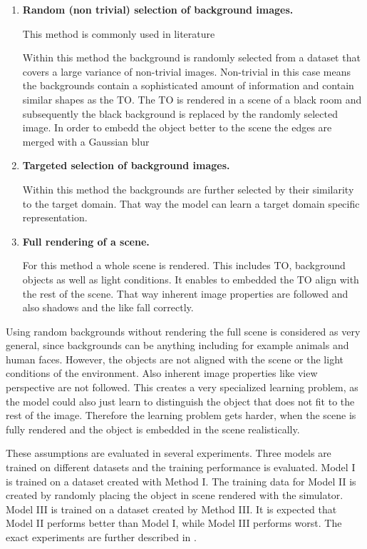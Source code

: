 \begin{enumerate}

\item \textbf{Random (non trivial) selection of background images.}

This method is commonly used in literature 

Within this method the background is randomly selected from a dataset that covers a large variance of non-trivial images. Non-trivial in this case means the backgrounds contain a sophisticated amount of information and contain similar shapes as the \ac{TO}. The \ac{TO} is rendered in a scene of a black room and subsequently the black background is replaced by the randomly selected image. In order to embedd the object better to the scene the edges are merged with a Gaussian blur 

\item \textbf{Targeted selection of background images.}

Within this method the backgrounds are further selected by their similarity to the target domain. That way the model can learn a target domain specific representation.

\item \textbf{Full rendering of a scene.}

For this method a whole scene is rendered. This includes \ac{TO}, background objects as well as light conditions. It enables to embedded the \ac{TO} align with the rest of the scene. That way inherent image properties are followed and also shadows and the like fall correctly.

\end{enumerate}

Using random backgrounds without rendering the full scene is considered as very general, since backgrounds can be anything including for example animals and human faces. However, the objects are not aligned with the scene or the light conditions of the environment. Also inherent image properties like view perspective are not followed. This creates a very specialized learning problem, as the model could also just learn to distinguish the object that does not fit to the rest of the image. Therefore the learning problem gets harder, when the scene is fully rendered and the object is embedded in the scene realistically.

These assumptions are evaluated in several experiments. Three models are trained on different datasets and the training performance is evaluated. Model I is trained on a dataset created with Method I. The training data for Model II is created by randomly placing the object in scene rendered with the simulator. Model III is trained on a dataset created by Method III. It is expected that Model II performs better than Model I, while Model III performs worst. The exact experiments are further described in .

